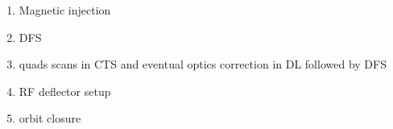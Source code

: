\begin{enumerate}
\begin{enumerate}
     \item Magnetic injection
     \item DFS
     \item quads scans in CTS and eventual optics correction in DL followed by DFS
     \item RF deflector setup 
     \item orbit closure
     
  \end{enumerate}

\end{enumerate}
